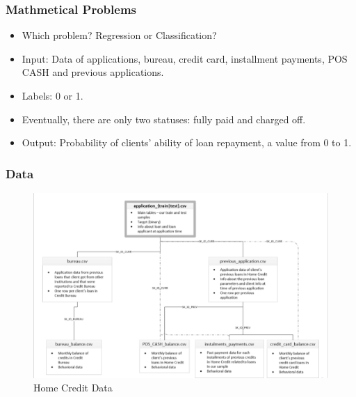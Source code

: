 \documentclass{beamer}
\begin{document}

\begin{frame}
\frametitle{Mathmetical Problems}
\begin{itemize}
\item Which problem? Regression or Classification? 
\item Input: Data of applications, bureau, credit card, installment payments, POS CASH and previous applications.
\item Labels: 0 or 1.
\item Eventually, there are only two statuses: fully paid and charged off. 
\item Output: Probability of clients' ability of loan repayment, a value from 0 to 1. 
\end{itemize}


\end{frame}

\begin{frame}
\frametitle{Data}
\begin{figure}
  \includegraphics[width=\linewidth]{pic/Home_Credit_data.png}
  \caption{Home Credit Data}
  \label{fig:data}
\end{figure}
\end{frame}
\end{document}

